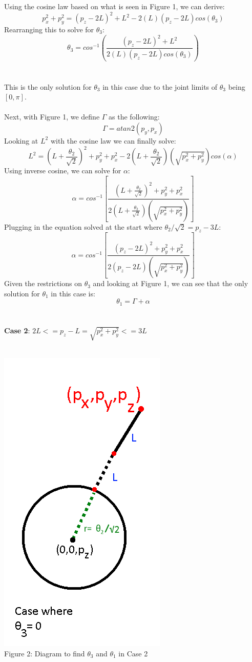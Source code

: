 \documentclass{article}
\begin{document}
Using the cosine law based on what is seen in Figure 1, we can derive:
$$p_x^2 + p_y^2 = (p_z -2L)^2 + L^2 - 2(L)(p_z-2L)cos(\theta_3)$$
Rearranging this to solve for $\theta_3$:
$$\theta_3 = cos^{-1}(\frac{(p_z -2L)^2 + L^2}{2(L)(p_z-2L)cos(\theta_3)}) $$
\\
\\
This is the only solution for $\theta_3$ in this case due to the joint limits of $\theta_3$ being $[0, \pi]$. 
\\
\\
Next, with Figure 1, we define $\Gamma$ as the following:
$$\Gamma = atan2(p_y,p_x)$$
Looking at $L^2$ with the cosine law we can finally solve:
$$L^2 = (L+\frac{\theta_2}{\sqrt{2}})^2 + p_y^2 + p_x^2 -2(L+ \frac{\theta_2}{\sqrt{2}})(\sqrt{p_x^2 + p_y^2})cos(\alpha)$$
Using inverse cosine, we can solve for $\alpha$:
$$\alpha = cos^{-1}[\frac{(L+\frac{\theta_2}{\sqrt{2}})^2 + p_y^2 + p_x^2}{2(L+ \frac{\theta_2}{\sqrt{2}})(\sqrt{p_x^2 + p_y^2})}]$$
Plugging in the equation solved at the start where $\theta_2/\sqrt{2} = p_z-3L$:
$$\alpha = cos^{-1}[\frac{(p_z-2L)^2 + p_y^2 + p_x^2}{2(p_z-2L)(\sqrt{p_x^2 + p_y^2})}]$$
Given the restrictions on $\theta_3$ and looking at Figure 1, we can see that the only solution for $\theta_1$ in this case is:
$$\theta_1 = \Gamma + \alpha$$
\\
\\
\textbf{Case 2}: $ 2L <= p_z - L = \sqrt{p_x^2 + p_y^2} <= 3L$
\\
\\
 \begin{center}
            \includegraphics[scale=0.5]{a3robot1.png}\\
            Figure 2: Diagram to find $\theta_3$ and $\theta_1$ in Case 2
            \\
 \end{center}
\end{document}
